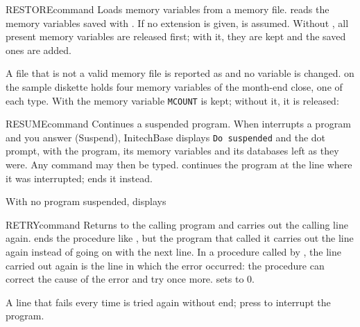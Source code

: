 \begin{XbaseEntry}{RESTORE}{command}
Loads memory variables from a memory file.
\Syntax
{}
\Usage
{} reads the memory variables saved with .  If no
extension is given,  is assumed.  Without , all
present memory variables are released first; with it, they are kept and the
saved ones are added.

A file that is not a valid memory file is reported as
 and no variable is changed.
\Examples
{} on the sample diskette holds four memory variables of the
month-end close, one of each type.  With  the memory variable
\texttt{MCOUNT} is kept; without it, it is released:
\end{XbaseEntry}

\begin{XbaseEntry}{RESUME}{command}
Continues a suspended program.
\Syntax
{}
\Usage
When  interrupts a program and you answer  (Suspend),
InitechBase displays \texttt{Do suspended} and the dot prompt, with the
program, its memory variables and its databases left as they were.  Any
command may then be typed.   continues the program at the line
where it was interrupted;  ends it instead.

With no program suspended,  displays 
\end{XbaseEntry}

\begin{XbaseEntry}{RETRY}{command}
Returns to the calling program and carries out the calling line again.
\Syntax
{}
\Usage
{} ends the procedure like , but the program that
called it carries out the  line again instead of going on with the
next line.  In a procedure called by , the line carried out
again is the line in which the error occurred: the procedure can correct the
cause of the error and try once more.   sets  to 0.

A line that fails every time is tried again without end; press  to
interrupt the program.
\end{XbaseEntry}

